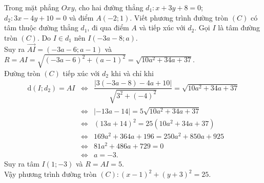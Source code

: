\begin{bt}%
	Trong mặt phẳng $Oxy$, cho hai đường thẳng $d_1\colon x+3y+8=0$; $d_2\colon 3x-4y+10=0$ và điểm $A(-2;1)$. Viết phương trình đường tròn $(C)$ có tâm thuộc đường thẳng $d_1$, đi qua điểm $A$ và tiếp xúc với $d_2$.
	\loigiai
	{
		Gọi $I$ là tâm đường tròn $(C)$. Do $I\in d_1$ nên $I(-3a-8;a)$.\\
		Suy ra $\overrightarrow{AI}=(-3a-6;a-1)$ và $R=AI=\sqrt{(-3a-6)^2+(a-1)^2}=\sqrt{10a^2+34a+37}$.\\
		Đường tròn $(C)$ tiếp xúc với $d_2$ khi và chỉ khi
		\allowdisplaybreaks
		\begin{eqnarray*}
			\mathrm{d}(I;d_2)=AI&\Leftrightarrow&\dfrac{|3(-3a-8)-4a+10|}{\sqrt{3^2+(-4)^2}}=\sqrt{10a^2+34a+37}\\
			&\Leftrightarrow&|-13a-14|=5\sqrt{10a^2+34a+37}\\
			&\Leftrightarrow& (13a+14)^2=25(10a^2+34a+37)\\
			&\Leftrightarrow&169a^2+364a+196=250a^2+850a+925\\
			&\Leftrightarrow&81a^2+486a+729=0\\
			&\Leftrightarrow&a=-3.
		\end{eqnarray*}
		Suy ra tâm $I(1;-3)$ và $R=AI=5$.\\
		Vậy phương trình đường tròn $(C)\colon (x-1)^2+(y+3)^2=25$.
	}
\end{bt}
